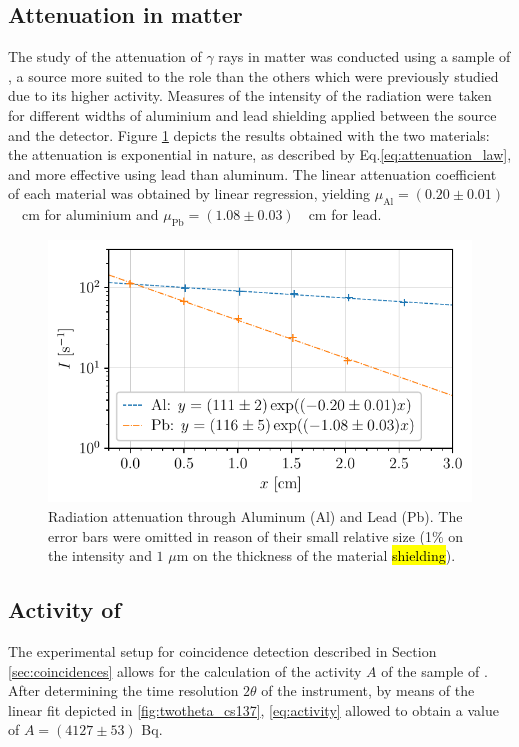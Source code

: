 \subsection{Attenuation in matter}
The study of the attenuation of $\gamma$ rays in matter was conducted using 
a sample of \cesium, a source more suited to the role than 
the others which were previously studied due to its higher activity\footnotemark.
Measures of the intensity of the radiation were taken for
different widths of aluminium and lead shielding applied 
between the source and the detector.
Figure \ref{fig:attenuation_coefficient} depicts the results obtained with 
the two materials:
the attenuation is exponential in nature, as described 
by Eq.\eqref{eq:attenuation_law}, and more effective using lead than aluminum.
The linear attenuation coefficient of each material was obtained by linear regression, yielding \mbox{$\mu_{\mathrm{Al}} = (0.20 \pm 0.01)$ \unit{\per\cm}} for aluminium
and \mbox{$\mu_{\mathrm{Pb}} = (1.08 \pm 0.03)$ \unit{\per\cm}} for lead.
\begin{figure}[htbp]
    \centering
    \includegraphics[scale=1]{figures/attenuation_coefficient.pdf}
    \caption{Radiation attenuation through Aluminum (Al) and Lead (Pb). 
             The error bars were omitted in reason of their small relative size 
             (1\% on the intensity and $1$ $\mu$m on the thickness of the material \hl{shielding}).}
    \label{fig:attenuation_coefficient}
\end{figure}

\subsection{Activity of \cobalt}
The experimental setup for coincidence detection described 
in Section \ref{sec:coincidences} allows for the calculation
of the activity $A$ of the sample of \cobalt.
After determining the time resolution $2\theta$ of 
the instrument, by means of the linear fit depicted in
\autoref{fig:twotheta_cs137}, \autoref{eq:activity} allowed 
to obtain a value of $A= (4127 \pm 53)$ Bq.

